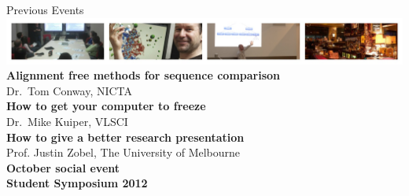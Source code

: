 \documentclass[svgnames]{beamer}
\begin{document}
\begin{frame}{Previous Events}
    \includegraphics[width=\linewidth]{./images/COMBINE-collage.jpg}
    \vspace{1ex}
    \textbf{Alignment free methods for sequence comparison}\\
    Dr.~Tom Conway, NICTA\\[2ex]
    \textbf{How to get your computer to freeze}\\
    Dr.~Mike Kuiper, VLSCI\\[2ex]
    \textbf{How to give a better research presentation}\\
    Prof. Justin Zobel, The University of Melbourne\\[2ex]
    \textbf{October social event}\\[2ex]
    \textbf{Student Symposium 2012}
\end{frame}
\end{document}
